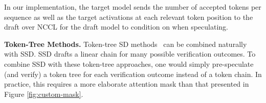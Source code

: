 In our implementation, the target model sends the number of accepted tokens per sequence as well as the target activations at each relevant token position to the draft over NCCL for the draft model to condition on when speculating. 

\textbf{Token-Tree Methods.} 
Token-tree SD methods~\citep{specinfer,sequoia,eagle2,eagle3} can be combined naturally with SSD.
SSD drafts a linear chain for many possible verification outcomes.
To combine SSD with these token-tree approaches, one would simply pre-speculate (and verify) a token tree for each verification outcome instead of a token chain.
In practice, this requires a more elaborate attention mask than that presented in Figure \ref{fig:custom-mask}.


\color{black}